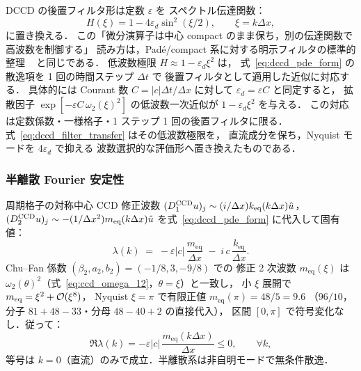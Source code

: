 DCCD の後置フィルタ形は定数 $\varepsilon$ を
スペクトル伝達関数：
\begin{equation}
  H(\xi) = 1 - 4\varepsilon_d\sin^2(\xi/2),
  \qquad \xi=k\Delta x,
  \label{eq:dccd_filter_transfer}
\end{equation}
に置き換える．
この「微分演算子は中心 compact のまま保ち，別の伝達関数で高波数を制御する」
読み方は，Padé/compact 系に対する明示フィルタの標準的整理
~\cite{Lele1992,GaitondeVisbal2000,VisbalGaitonde2002} と同じである．
低波数極限 $H\approx 1-\varepsilon_d\xi^2$ は，
式~\eqref{eq:dccd_pde_form} の散逸項を 1 回の時間ステップ $\Delta t$ で
後置フィルタとして適用した近似に対応する．
具体的には Courant 数 $C=|c|\Delta t/\Delta x$ に対して
$\varepsilon_d=\varepsilon C$ と同定すると，
拡散因子 $\exp[-\varepsilon C\,\omega_2(\xi)^2]$ の低波数一次近似が
$1-\varepsilon_d\xi^2$ を与える．
この対応は定数係数・一様格子・1 ステップ 1 回の後置フィルタに限る．
式~\eqref{eq:dccd_filter_transfer} はその低波数極限を，
直流成分を保ち，Nyquist モードを $4\varepsilon_d$ で抑える
波数選択的な評価形へ置き換えたものである．

\subsubsection{半離散 Fourier 安定性}
\label{sec:dccd_eigenvalue}

周期格子の対称中心 CCD 修正波数
$(D_1^{\mathrm{CCD}}u)_j \sim (i/\Delta x) k_{\text{eq}}(k\Delta x)\hat u$，
$(D_2^{\mathrm{CCD}}u)_j \sim -(1/\Delta x^2) m_{\text{eq}}(k\Delta x)\hat u$
を式~\eqref{eq:dccd_pde_form} に代入して固有値：
\begin{equation}
  \lambda(k) \;=\; -\varepsilon|c|\,\frac{m_{\text{eq}}}{\Delta x}
                 \;-\; i\,c\,\frac{k_{\text{eq}}}{\Delta x}.
  \label{eq:dccd_eigenvalue}
\end{equation}
Chu--Fan 係数 $(\beta_2,a_2,b_2)=(-1/8, 3, -9/8)$ での
修正 2 次波数 $m_{\text{eq}}(\xi)$ は
$\omega_2(\theta)^2$（式~\eqref{eq:ccd_omega_12}，$\theta=\xi$）と一致し，
小 $\xi$ 展開で $m_{\text{eq}}=\xi^2+\mathcal{O}(\xi^8)$，
Nyquist $\xi=\pi$ で有限正値 $m_{\text{eq}}(\pi)=48/5=9.6$
（$96/10$，分子 $81+48-33$・分母 $48-40+2$ の直接代入），
区間 $[0,\pi]$ で符号変化なし．従って：
\begin{equation}
  \Re\lambda(k) = -\varepsilon|c|\,\frac{m_{\text{eq}}(k\Delta x)}{\Delta x} \le 0,
  \qquad \forall k,
  \label{eq:dccd_dissipative}
\end{equation}
等号は $k=0$（直流）のみで成立．半離散系は非自明モードで無条件散逸．

